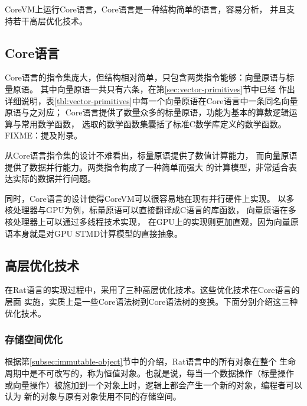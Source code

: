 CoreVM上运行Core语言，Core语言是一种结构简单的语言，容易分析，
并且支持若干高层优化技术。

\subsection{Core语言}
Core语言的指令集庞大，但结构相对简单，只包含两类指令能够：向量原语与标量原语。
其中向量原语一共只有六条，在第\ref{sec:vector-primitives}节中已经
作出详细说明，表\ref{tbl:vector-primitives}中每一个向量原语在Core语言中一条同名向量原语与之对应；
Core语言提供了数量众多的标量原语，功能为基本的算数逻辑运算与常用数学函数，
选取的数学函数集囊括了标准C数学库定义的数学函数。
FIXME：提及附录。

从Core语言指令集的设计不难看出，标量原语提供了数值计算能力，
而向量原语提供了数据并行能力。两类指令构成了一种简单而强大
的计算模型，非常适合表达实际的数据并行问题。

同时，Core语言的设计使得CoreVM可以很容易地在现有并行硬件上实现。
以多核处理器与GPU为例，标量原语可以直接翻译成C语言的库函数，
向量原语在多核处理器上可以通过多线程技术实现，
在GPU上的实现则更加直观，因为向量原语本身就是对GPU STMD计算模型的直接抽象。


\subsection{高层优化技术}
在Rat语言的实现过程中，采用了三种高层优化技术。这些优化技术在Core语言的层面
实施，实质上是一些Core语法树到Core语法树的变换。下面分别介绍这三种优化技术。

\subsubsection{存储空间优化}
根据第\ref{subsec:immutable-object}节中的介绍，Rat语言中的所有对象在整个
生命周期中是不可改写的，称为恒值对象。也就是说，每当一个数据操作（标量操作
或向量操作）被施加到一个对象上时，逻辑上都会产生一个新的对象，编程者可以认为
新的对象与原有对象使用不同的存储空间。

